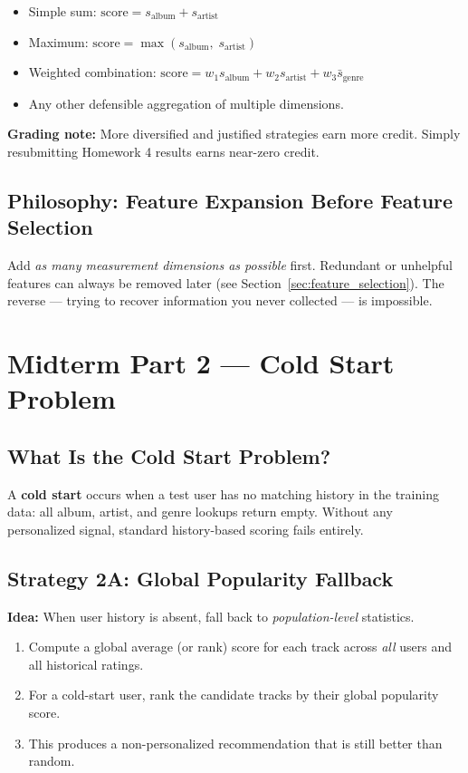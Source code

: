 \documentclass[11pt]{article}
\begin{document}
\begin{itemize}
    \item Simple sum: $\text{score} = s_\text{album} + s_\text{artist}$
    \item Maximum: $\text{score} = \max(s_\text{album},\; s_\text{artist})$
    \item Weighted combination: $\text{score} = w_1 s_\text{album} + w_2 s_\text{artist} + w_3 \bar{s}_\text{genre}$
    \item Any other defensible aggregation of multiple dimensions.
\end{itemize}

\textbf{Grading note:} More diversified and justified strategies earn more credit.
Simply resubmitting Homework 4 results earns near-zero credit.

\subsection{Philosophy: Feature Expansion Before Feature Selection}
Add \emph{as many measurement dimensions as possible} first.
Redundant or unhelpful features can always be removed later (see Section~\ref{sec:feature_selection}).
The reverse --- trying to recover information you never collected --- is impossible.


\section{Midterm Part 2 --- Cold Start Problem}

\subsection{What Is the Cold Start Problem?}
A \textbf{cold start} occurs when a test user has no matching history in the training data:
all album, artist, and genre lookups return empty.
Without any personalized signal, standard history-based scoring fails entirely.

\subsection{Strategy 2A: Global Popularity Fallback}
\textbf{Idea:} When user history is absent, fall back to \emph{population-level} statistics.

\begin{enumerate}
    \item Compute a global average (or rank) score for each track across \emph{all} users and all historical ratings.
    \item For a cold-start user, rank the candidate tracks by their global popularity score.
    \item This produces a non-personalized recommendation that is still better than random.
\end{enumerate}
\end{document}
